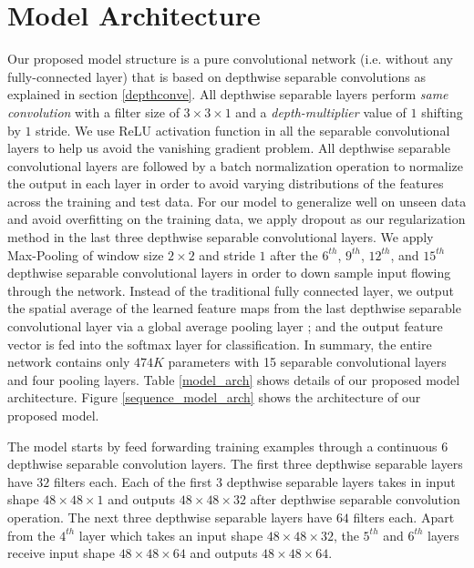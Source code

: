 \documentclass[master]{thesis-uestc}
\begin{document}
\section{Model Architecture}
Our proposed model structure is a pure convolutional network (i.e. without any fully-connected layer) that is based on depthwise separable convolutions as explained in section \ref{depthconve}. All depthwise separable layers perform \textit{same convolution} with a filter size of $3 \times 3 \times 1$ and a \textit{depth-multiplier} value of $1$ shifting by $1$ stride. We use ReLU\cite{7410480} activation function in all the separable convolutional layers to help us avoid the vanishing gradient problem\cite{5264952}. All depthwise separable convolutional layers are followed by a batch normalization operation\cite{DBLP:journals/corr/IoffeS15} to normalize the output in each layer in order to avoid varying distributions of the features across the training and test data. For our model to generalize well on unseen data and avoid overfitting on the training data, we apply dropout\cite{JMLR:v15:srivastava14a} as our regularization method in the last three depthwise separable convolutional layers. We apply Max-Pooling of window size $2 \times 2$ and stride $1$ after the $6^{th}$, $9^{th}$, $12^{th}$, and $15^{th}$ depthwise separable convolutional layers in order to down sample input flowing through the network. Instead of the traditional fully connected layer, we output the spatial average of the learned feature maps from the last depthwise separable convolutional layer via a global average pooling layer \cite{DBLP:journals/corr/LinCY13}; and the output feature vector is fed into the softmax layer for classification.  In summary, the entire network contains only $474K$ parameters with 15 separable convolutional layers and four pooling layers. Table \ref{model_arch} shows details of our proposed model architecture. Figure \ref{sequence_model_arch} shows the architecture of our proposed model.

The model starts by feed forwarding training examples through a continuous $6$ depthwise separable convolution layers. The first three depthwise separable layers have $32$ filters each. Each of the first $3$ depthwise separable layers takes in input shape $48 \times 48 \times 1$ and outputs $48 \times 48 \times 32$ after depthwise separable convolution operation. The next three depthwise separable layers have $64$ filters each. Apart from the $4^{th}$ layer which takes an input shape $48 \times 48 \times 32$, the $5^{th}$ and $6^{th}$ layers receive input shape $48 \times 48 \times 64$ and outputs $48 \times 48 \times 64$.
\end{document}
